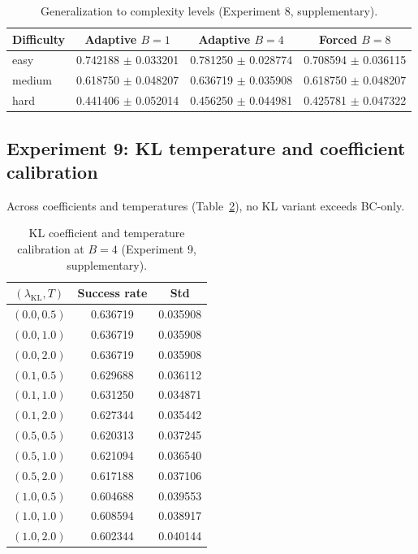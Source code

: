 \documentclass{article}
\begin{document}
\begin{table}[t]
\centering
\caption{Generalization to complexity levels (Experiment 8, supplementary).}
\label{tab:complexities}
\begin{tabular}{lccc}
\toprule
Difficulty & Adaptive $B{=}1$ & Adaptive $B{=}4$ & Forced $B{=}8$ \\
\midrule
easy & 0.742188 $\pm$ 0.033201 & 0.781250 $\pm$ 0.028774 & 0.708594 $\pm$ 0.036115 \\
medium & 0.618750 $\pm$ 0.048207 & 0.636719 $\pm$ 0.035908 & 0.618750 $\pm$ 0.048207 \\
hard & 0.441406 $\pm$ 0.052014 & 0.456250 $\pm$ 0.044981 & 0.425781 $\pm$ 0.047322 \\
\bottomrule
\end{tabular}
\end{table}

\subsection{Experiment 9: KL temperature and coefficient calibration}
Across coefficients and temperatures (Table~\ref{tab:kl_calib}), no KL variant exceeds BC-only.

\begin{table}[t]
\centering
\caption{KL coefficient and temperature calibration at $B{=}4$ (Experiment 9, supplementary).}
\label{tab:kl_calib}
\begin{tabular}{ccc}
\toprule
$(\lambda_{\text{KL}}, T)$ & Success rate & Std \\
\midrule
$(0.0, 0.5)$ & 0.636719 & 0.035908 \\
$(0.0, 1.0)$ & 0.636719 & 0.035908 \\
$(0.0, 2.0)$ & 0.636719 & 0.035908 \\
$(0.1, 0.5)$ & 0.629688 & 0.036112 \\
$(0.1, 1.0)$ & 0.631250 & 0.034871 \\
$(0.1, 2.0)$ & 0.627344 & 0.035442 \\
$(0.5, 0.5)$ & 0.620313 & 0.037245 \\
$(0.5, 1.0)$ & 0.621094 & 0.036540 \\
$(0.5, 2.0)$ & 0.617188 & 0.037106 \\
$(1.0, 0.5)$ & 0.604688 & 0.039553 \\
$(1.0, 1.0)$ & 0.608594 & 0.038917 \\
$(1.0, 2.0)$ & 0.602344 & 0.040144 \\
\bottomrule
\end{tabular}
\end{table}
\end{document}
